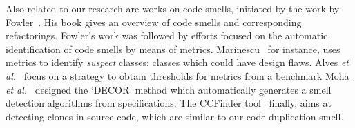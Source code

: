 \documentclass{sig-alternate}
\begin{document}
Also related to our research are works on code smells, initiated by the work by Fowler~\cite{fowler_refactoring:_1999}. His book gives an overview of code smells and corresponding refactorings. Fowler's work was followed by efforts focused on the automatic identification of code smells by means of metrics. Marinescu~\cite{marinescu_detecting_2001} for instance, uses metrics to identify \emph{suspect} classes: classes which could have design flaws. Alves \emph{et al.}~\cite{alves_deriving_2010} focus on a strategy to obtain thresholds for metrics from a benchmark Moha \emph{et al.}~\cite{moha_decor:_2010} designed the `DECOR' method which automatically generates a smell detection algorithms from specifications. The CCFinder tool~\cite{kamiya_ccfinder:_2002} finally, aims at detecting clones in source code, which are similar to our code duplication smell.





\end{document}
